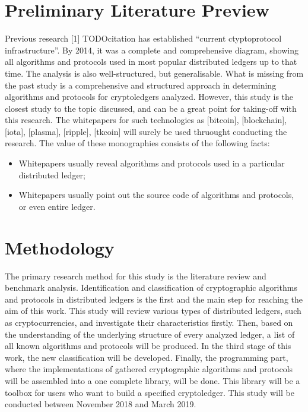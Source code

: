 \documentclass[12pt]{article}
\begin{document}
\section{Preliminary Literature Preview}
Previous research [1] TODOcitation has established ``current ctyptoprotocol
infrastructure''. By 2014, it was a complete and comprehensive diagram, showing
all algorithms and protocols used in most popular distributed ledgers up to
that time. The analysis is also well-structured, but generalisable. What is
missing from the past study is a comprehensive and structured approach
in determining algorithms and protocols for cryptoledgers analyzed. However,
this study is the closest study to the topic discussed, and can be a great
point for taking-off with this research. The whitepapers for such technologies
as [bitcoin], [blockchain], [iota], [plasma], [ripple], [tkcoin] will surely be
used thruought conducting the research. The value of these monographies
consists of the following facts:
\begin{itemize}
    \item Whitepapers usually reveal algorithms and protocols used in a
          particular distributed ledger;
    \item Whitepapers usually point out the source code of algorithms and
          protocols, or even entire ledger.
\end{itemize}

\section{Methodology}
The primary research method for this study is the literature review and benchmark
analysis. Identification and classification of cryptographic algorithms and
protocols in distributed ledgers is the first and the main step for reaching the aim of this work. This study will  review various types of distributed
ledgers, such as cryptocurrencies, and investigate their characteristics firstly. Then,
based on the understanding of the underlying structure of every analyzed ledger, a
list of all known algorithms and protocols will be produced. In the third stage
of this work, the new classification will be developed. Finally, the
programming part, where the implementations of gathered
cryptographic algorithms and protocols will be assembled into a one complete
library, will be done. This library will be a toolbox for users who want to build a specified
cryptoledger. This study will be conducted between November 2018 and March 2019.
\end{document}
